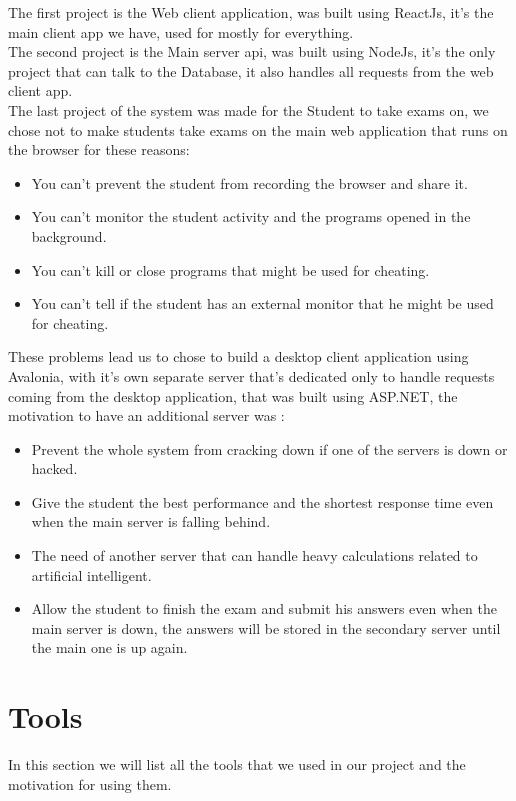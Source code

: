 \documentclass[]{uc2pfecaneva}
\begin{document}
    The first project is the Web client application, was built using ReactJs, it’s the main client app we have, used for mostly for everything. \\
    The second project is the Main server api, was built using NodeJs, it’s the only project that can talk to the Database, it also handles all requests from the web client app. \\
    The last project of the system was made for the Student to take exams on, we chose not to make students take exams on the main web application that runs on the browser for these reasons:

    \begin{itemize}
        \item You can’t prevent the student from recording the browser and share it.
        \item You can’t monitor the student activity and the programs opened in the background.
        \item You can’t kill or close programs that might be used for cheating.
        \item You can’t tell if the student has an external monitor that he might be used for cheating.
    \end{itemize}


    These problems lead us to chose to build a desktop client application using Avalonia, with it’s own separate server that’s dedicated only to handle requests coming from the desktop application, that was built using ASP.NET, the motivation to have an additional server was :

    \begin{itemize}
        \item Prevent the whole system from cracking down if one of the servers is down or hacked.
        \item Give the student the best performance and the shortest response time even when the main server is falling behind.
        \item The need of another server that can handle heavy calculations related to artificial intelligent.
        \item Allow the student to finish the exam and submit his answers even when the main server is down, the answers  will be stored in the secondary server until the main one is up again.
    \end{itemize}




    \section{Tools}
    In this section we will list all the tools that we used in our project and the motivation for using them. \\
\end{document}
